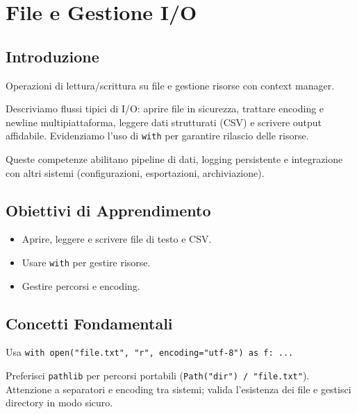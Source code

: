 \chapter{File e Gestione I/O}

\section{Introduzione}
Operazioni di lettura/scrittura su file e gestione risorse con context manager.

Descriviamo flussi tipici di I/O: aprire file in sicurezza, trattare encoding e newline multipiattaforma, leggere dati strutturati (CSV) e scrivere output affidabile. Evidenziamo l'uso di \texttt{with} per garantire rilascio delle risorse.

Queste competenze abilitano pipeline di dati, logging persistente e integrazione con altri sistemi (configurazioni, esportazioni, archiviazione).

\section{Obiettivi di Apprendimento}
\begin{itemize}
  \item Aprire, leggere e scrivere file di testo e CSV.
  \item Usare \texttt{with} per gestire risorse.
  \item Gestire percorsi e encoding.
\end{itemize}

\section{Concetti Fondamentali}
\begin{tcolorbox}[title=Context Manager]
Usa \texttt{with open("file.txt", "r", encoding="utf-8") as f: ...}
\end{tcolorbox}
\begin{tcolorbox}[title=Percorsi e filesystem]
Preferisci \texttt{pathlib} per percorsi portabili (\texttt{Path("dir") / "file.txt"}). Attenzione a separatori e encoding tra sistemi; valida l'esistenza dei file e gestisci directory in modo sicuro.
\end{tcolorbox}


